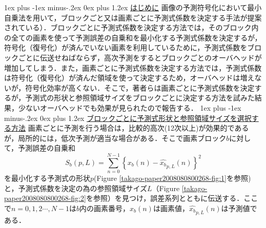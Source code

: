 \documentclass[9pt,dvipdfmx]{jsarticle}
\makeatletter
\def\section{\@startsection {section}{1}{\z@}
{1ex plus -1ex minus-.2ex}%
{0ex plus 1.2ex}%
 {\normalsize\bf}%
 }
\makeatother
\begin{document}
\section{\underline{はじめに}}
画像の予測符号化において最小自乗法を用いて，ブロックごと又は画素ごとに予測式係数を決定する手法が提案されている）\cite{sdkguide}．ブロックごとに予測式係数を決定する方法では，そのブロック内の全ての画素を使って予測誤差の自乗和を最小化する予測式係数を決定するが，符号化（復号化）が済んでいない画素を利用しているために，予測式係数をブロックごとに伝送せねばならず，高次予測をするとブロックごとのオーバヘッドが増加してしまう．また，画素ごとに予測式係数を決定する方法では，予測式係数は符号化（復号化）が済んだ領域を使って決定するため，オーバヘッドは増えないが，符号化効率が高くない．そこで，著者らは画素ごとに予測式係数を決定するが，予測式の形状と参照領域サイズをブロックごとに決定する方法を試みた結果，少ないオーバヘッドでも効果が見られたので報告する．
\section{\underline{ブロックごとに予測式形状と参照領域サイズを選択する方法}}
画素ごとに予測を行う場合は，比較的高次(12次以上)が効果的であるが，局所的には，低次予測が適当な場合がある．そこで画素ブロック$b$に対して，予測誤差の自乗和
$$
S_b(p,L)=\sum_{n=0}^{N-1} \left\{ x_b(n)-\hat{x_b}_{p,L}(n) \right\}^2
$$
を最小化する予測式の形状$p$(Figure \ref{takago-paper2008080800268-fig:1}を参照)と，予測式係数を決定の為の参照領域サイズ$L$（Figure \ref{takago-paper2008080800268-fig:2}を参照）を見つけ，誤差系列とともに伝送する．ここで$n=0,1,2\cdots,N-1$は$b$内の画素番号，$x_b(n)$は画素値，$\hat{x_b}_{p,L}(n)$は予測値である．
\end{document}
